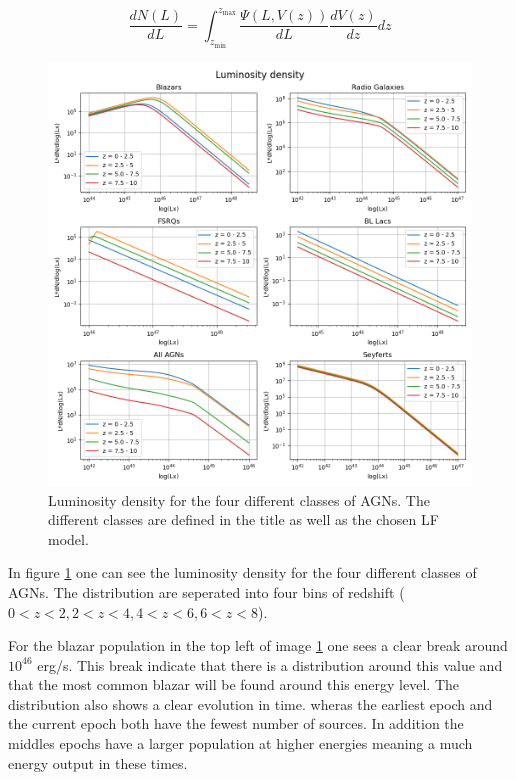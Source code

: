 \documentclass{article}
\begin{document}
\begin{equation}
    \frac{dN(L)}{dL} = \int_{z_{\text{min}}}^{z_{\text{max}}} \frac{\Psi(L, V(z))}{dL} \frac{dV(z)}{dz} dz
\end{equation}


\begin{figure}
    \centering
    \includegraphics[width = \textwidth]{new_plots/Luminosity density.png}
    \caption{Luminosity density for the four different classes of AGNs. The different classes are defined in the title as well as the chosen LF model.}
    \label{fig:LD}
\end{figure}

In figure \ref{fig:LD} one can see the luminosity density for the four different classes of AGNs. The distribution are 
seperated into four bins of redshift ($0<z<2,2<z<4,4<z<6,6<z<8$). %
  
For the blazar population in the top left of image \ref{fig:LD} one sees a clear break around $10^{46}$ erg/s. This break indicate that there is a distribution
around this value and that the most common blazar will be found around this energy level. The distribution also shows a clear evolution in time. wheras the earliest epoch
and the current epoch both have the fewest number of sources. In addition the middles epochs have a larger population at higher energies meaning a much energy output in these times. 
\end{document}
